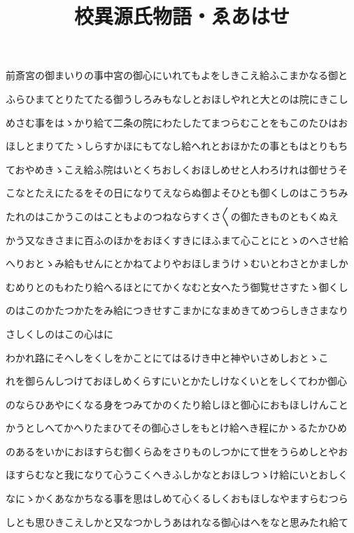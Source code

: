 \documentclass[a4paper,11pt,landscape]{ltjtarticle}
\title{校異源氏物語・ゑあはせ}
\date{}
\begin{document}
\maketitle

前斎宮の御まいりの事中宮の御心にいれてもよをしきこえ給ふこまかなる御と
\par\medskip
ふらひまてとりたてたる御うしろみもなしとおほしやれと大とのは院にきこし
\par\medskip
めさむ事をはゝかり給て二条の院にわたしたてまつらむことをもこのたひはお
\par\medskip
ほしとまりてたゝしらすかほにもてなし給へれとおほかたの事ともはとりもち
\par\medskip
ておやめきゝこえ給ふ院はいとくちおしくおほしめせと人わろけれは御せうそ
\par\medskip
こなとたえにたるをその日になりてえならぬ御よそひとも御くしのはこうちみ
\par\medskip
たれのはこかうこのはこともよのつねならすくさ〱の御たきものともくぬえ
\par\medskip
かう又なきさまに百ふのほかをおほくすきにほふまて心ことにとゝのへさせ給
\par\medskip
へりおとゝみ給もせんにとかねてよりやおほしまうけゝむいとわさとかましか
\par\medskip
むめりとのもわたり給へるほとにてかくなむと女へたう御覧せさすたゝ御くし
\par\medskip
のはこのかたつかたをみ給につきせすこまかになまめきてめつらしきさまなり
\par\medskip
さしくしのはこの心はに
\par\medskip
わかれ路にそへしをくしをかことにてはるけき中と神やいさめしおとゝこ
\par\medskip
れを御らんしつけておほしめくらすにいとかたしけなくいとをしくてわか御心
\par\medskip
のならひあやにくなる身をつみてかのくたり給しほと御心におもほしけんこと
\par\medskip
かうとしへてかへりたまひてその御心さしをもとけ給へき程にかゝるたかひめ
\par\medskip
のあるをいかにおほすらむ御くらゐをさりものしつかにて世をうらめしとやお
\par\medskip
ほすらむなと我になりて心うこくへきふしかなとおほしつゝけ給にいとおしく
\par\medskip
なにゝかくあなかちなる事を思はしめて心くるしくおもほしなやますらむつら
\par\medskip
しとも思ひきこえしかと又なつかしうあはれなる御心はへをなと思みたれ給て
\par\medskip
\end{document}

